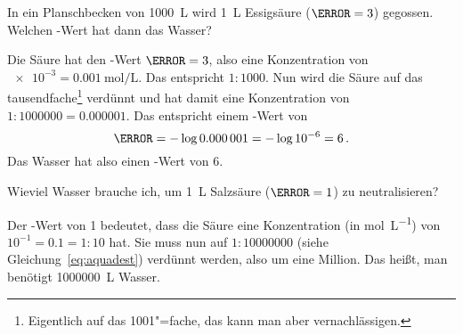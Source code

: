 \documentclass{scrartcl}
\begin{document}
\begin{table}
  \centering
  \caption{Zusammenhang zwischen \pH-Wert und der Konzentration von
    Oxonium"=Ionen in Wasser in \si{\mole\per\liter}.}
  \label{tab:pH-Werte}
\end{table}

\newpage
{}

\begin{question}
  In ein Planschbecken von \SI{1000}{\liter} wird \SI{1}{\liter} Essigsäure
  ($\pH=3$) gegossen.  Welchen \pH-Wert hat dann das Wasser?
\end{question}
\begin{solution}
  Die Säure hat den \pH-Wert $\pH = 3$, also eine Konzentration von $\num{e-3} =
  \SI{0.001}{\mole\per\liter}$.   Das entspricht $\num{1}:\num{1000}$.  Nun
  wird die Säure auf das tausendfache\footnote{Eigentlich auf das
    \num{1001}"=fache, das kann man aber vernachlässigen.} verdünnt und hat
  damit eine Konzentration von $1:\num{1000000} =\num{0.000001}$.  Das
  entspricht einem \pH-Wert von
\begin{equation*}
  \pH = -\log\num{0.000001} = -\log 10^{-6} = 6 \,.
\end{equation*}
Das Wasser hat also einen \pH-Wert von 6.
\end{solution}

\begin{question}[ID=1literhcl]
  Wieviel Wasser brauche ich, um \SI{1}{\liter} Salzsäure ($\pH = 1$) zu
  neutralisieren?
\end{question}
\begin{solution}
  Der \pH-Wert von 1 bedeutet, dass die Säure eine Konzentration (in
  \si{\mole\per\liter}) von $10^{-1} = 0.1 = 1:10$ hat.  Sie muss nun auf
  $\num{1}:\num{10000000}$ (siehe Gleichung~\eqref{eq:aquadest}) verdünnt
  werden, also um eine Million.  Das heißt, man benötigt \SI{1000000}{\liter}
  Wasser.
\end{solution}
\end{document}
